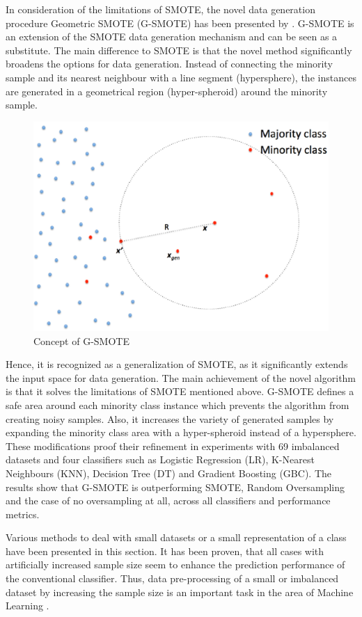 \documentclass[parskip=full]{scrartcl}
\begin{document}
In consideration of the limitations of SMOTE, the novel data generation procedure Geometric SMOTE (G-SMOTE) has been presented by \cite{Douzas.2017}. G-SMOTE is an extension of the SMOTE data generation mechanism and can be seen as a substitute. The main difference to SMOTE is that the novel method significantly broadens the options for data generation. Instead of connecting the minority sample and its nearest neighbour with a line segment (hypersphere), the instances are generated in a geometrical region (hyper-spheroid) around the minority sample. 

\begin{figure}[h]
	\centering
	\includegraphics[width=0.5\linewidth]{GSMOTE}
	\caption{Concept of G-SMOTE}
	\label{fig:gsmote}
\end{figure}

Hence, it is recognized as a generalization of SMOTE, as it significantly extends the input space for data generation. The main achievement of the novel algorithm is that it solves the limitations of SMOTE mentioned above. G-SMOTE defines a safe area around each minority class instance which prevents the algorithm from creating noisy samples. Also, it increases the variety of generated samples by expanding the minority class area with a hyper-spheroid instead of a hypersphere. These modifications proof their refinement in experiments with 69 imbalanced datasets and four classifiers such as Logistic Regression (LR), K-Nearest Neighbours (KNN), Decision Tree (DT) and Gradient Boosting (GBC). The results show that G-SMOTE is outperforming SMOTE, Random Oversampling and the case of no oversampling at all, across all classifiers and performance metrics.  

Various methods to deal with small datasets or a small representation of a class have been presented in this section. It has been proven, that all cases with artificially increased sample size seem to enhance the prediction performance of the conventional classifier. Thus, data pre-processing of a small or imbalanced dataset by increasing the sample size is an important task in the area of Machine Learning \cite{Ruparel.2013}.
\end{document}

